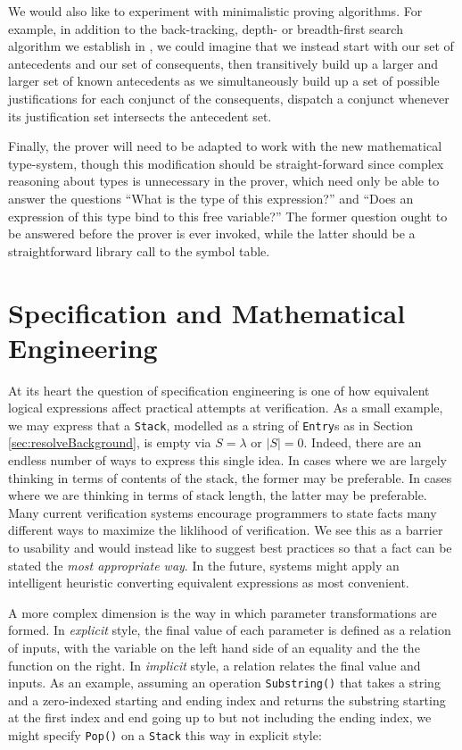 We would also like to experiment with minimalistic proving algorithms.  For example, in addition to the back-tracking, depth- or breadth-first search algorithm we establish in \cite{smith10}, we could imagine that we instead start with our set of antecedents and our set of consequents, then transitively build up a larger and larger set of known antecedents as we simultaneously build up a set of possible justifications for each conjunct of the consequents, dispatch a conjunct whenever its justification set intersects the antecedent set. 

Finally, the prover will need to be adapted to work with the new mathematical type-system, though this modification should be straight-forward since complex reasoning about types is unnecessary in the prover, which need only be able to answer the questions ``What is the type of this expression?'' and ``Does an expression of this type bind to this free variable?''  The former question ought to be answered before the prover is ever invoked, while the latter should be a straightforward library call to the symbol table.

\section{Specification and Mathematical Engineering}
At its heart the question of specification engineering is one of how equivalent logical expressions affect practical attempts at verification.  As a small example, we may express that a \texttt{Stack}, modelled as a string of \texttt{Entry}s as in Section \ref{sec:resolveBackground}, is empty via $S = \lambda$ or $|S| = 0$.  Indeed, there are an endless number of ways to express this single idea.  In cases where we are largely thinking in terms of contents of the stack, the former may be preferable.  In cases where we are thinking in terms of stack length, the latter may be preferable.  Many current verification systems encourage programmers to state facts many different ways to maximize the liklihood of verification.  We see this as a barrier to usability and would instead like to suggest best practices so that a fact can be stated the \emph{most appropriate way}.  In the future, systems might apply an intelligent heuristic converting equivalent expressions as most convenient.

A more complex dimension is the way in which parameter transformations are formed.  In \emph{explicit} style, the final value of each parameter is defined as a relation of inputs, with the variable on the left hand side of an equality and the the function on the right.  In \emph{implicit} style, a relation relates the final value and inputs.  As an example, assuming an operation \texttt{Substring()} that takes a string and a zero-indexed starting and ending index and returns the substring starting at the first index and end going up to but not including the ending index, we might specify \texttt{Pop()} on a \texttt{Stack} this way in explicit style:

